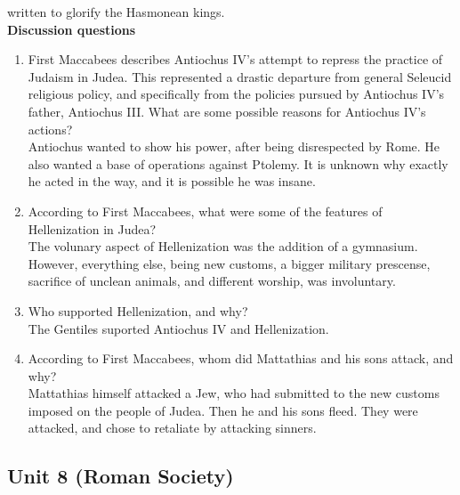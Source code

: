 \documentclass{article}
\begin{document}
written to glorify the Hasmonean kings. \\
\textbf{Discussion questions}
\begin{enumerate}
  \item First Maccabees describes Antiochus IV’s attempt to repress the practice of Judaism
  in Judea. This represented a drastic departure from general Seleucid religious policy, and
  specifically from the policies pursued by Antiochus IV’s father, Antiochus III. What are
  some possible reasons for Antiochus IV’s actions? \\
  Antiochus wanted to show his power, after being disrespected by Rome. He also wanted a
  base of operations against Ptolemy. It is unknown why exactly he acted in the way, and it is
  possible he was insane.
  \item According to First Maccabees, what were some of the features of Hellenization in Judea? \\
  The volunary aspect of Hellenization was the addition of a gymnasium. However, everything
  else, being new customs, a bigger military prescense, sacrifice of unclean animals, and different
  worship, was involuntary.
  \item Who supported Hellenization, and why? \\
  The Gentiles suported Antiochus IV and Hellenization.
  \item According to First Maccabees, whom did Mattathias and his sons attack, and why? \\
  Mattathias himself attacked a Jew, who had submitted to the new customs imposed on the
  people of Judea. Then he and his sons fleed. They were attacked, and chose to retaliate by
  attacking sinners.
\end{enumerate}
\subsection*{Unit 8 (Roman Society)}
\end{document}
